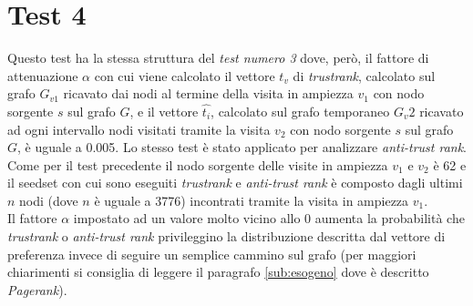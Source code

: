 \section{Test 4}
Questo test ha la stessa struttura del \textit{test numero 3} dove, però, il fattore di attenuazione \(\alpha\) con cui viene calcolato  il vettore \(t_v\) di \textit{trustrank}, calcolato sul grafo \(G_{v1}\) ricavato dai nodi al termine della visita in ampiezza \(v_1\) con nodo sorgente \(s\)  sul grafo \(G\), e il vettore \(\hat{t_i}\), calcolato sul grafo temporaneo \(G_v2\) ricavato ad ogni intervallo nodi visitati tramite la visita \(v_2\) con nodo sorgente \(s\) sul grafo \(G\), è uguale a 0.005. Lo stesso test è stato applicato per analizzare \textit{anti-trust rank}. Come per il test precedente il nodo sorgente delle visite in ampiezza \(v_1\) e \(v_2\) è 62  e il seedset con cui sono eseguiti \textit{trustrank} e \textit{anti-trust rank} è composto dagli ultimi \(n\) nodi (dove \(n\) è uguale a 3776)  incontrati tramite la visita in ampiezza \(v_1\).\\
Il fattore \(\alpha\) impostato ad un valore molto vicino allo 0 aumenta la probabilità che \textit{trustrank} o \textit{anti-trust rank}  privileggino la distribuzione descritta dal vettore di preferenza invece di seguire un semplice cammino sul grafo (per maggiori chiarimenti si consiglia di leggere il paragrafo \ref{sub:esogeno} dove è descritto \textit{Pagerank}).


